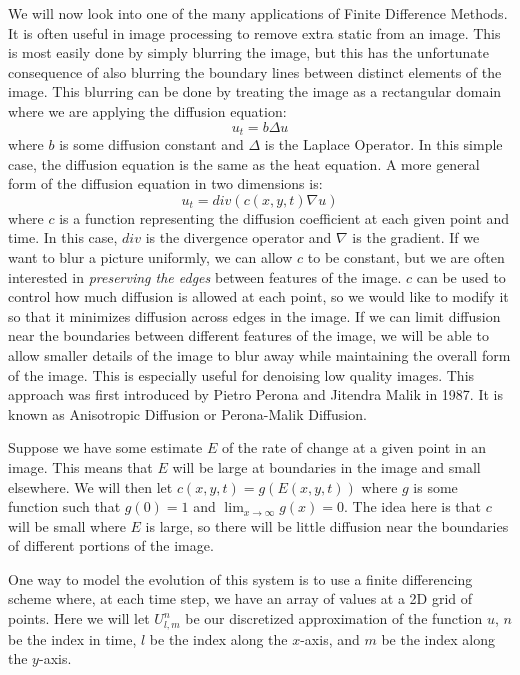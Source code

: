 \label{lab:AnisotropicDiffusion}


We will now look into one of the many applications of Finite Difference Methods.
It is often useful in image processing to remove extra static from an image.
This is most easily done by simply blurring the image, but this has the unfortunate consequence of also blurring the boundary lines between distinct elements of the image.
This blurring can be done by treating the image as a rectangular domain where we are applying the diffusion equation:
\[u_t = b \Delta u\]
where $b$ is some diffusion constant and $\Delta$ is the Laplace Operator.
In this simple case, the diffusion equation is the same as the heat equation.
A more general form of the diffusion equation in two dimensions is:
\[u_t = div \left( c(x,y,t) \nabla u \right)\]
where $c$ is a function representing the diffusion coefficient at each given point and time.
In this case, $div$ is the divergence operator and $\nabla$ is the gradient.
If we want to blur a picture uniformly, we can allow $c$ to be constant, but we are often interested in \textit{preserving the edges} between features of the image.
$c$ can be used to control how much diffusion is allowed at each point, so we would like to modify it so that it minimizes diffusion across edges in the image.
If we can limit diffusion near the boundaries between different features of the image, we will be able to allow smaller details of the image to blur away while maintaining the overall form of the image.
This is especially useful for denoising low quality images. 
This approach was first introduced by Pietro Perona and Jitendra Malik in 1987.
It is known as Anisotropic Diffusion or Perona-Malik Diffusion.

Suppose we have some estimate $E$ of the rate of change at a given point in an image.
This means that $E$ will be large at boundaries in the image and small elsewhere.
We will then let $c(x,y,t) = g(E(x,y,t))$ where $g$ is some function such that $g(0)=1$ and $\displaystyle{\lim_{x \to \infty} g(x) = 0}$. 
The idea here is that $c$ will be small where $E$ is large, so there will be little diffusion near the boundaries of different portions of the image.

One way to model the evolution of this system is to use a finite differencing scheme where, at each time step, we have an array of values at a 2D grid of points.
Here we will let $U_{l,m}^n$ be our discretized approximation of the function $u$, $n$ be the index in time, $l$ be the index along the $x$-axis, and $m$ be the index along the $y$-axis.

